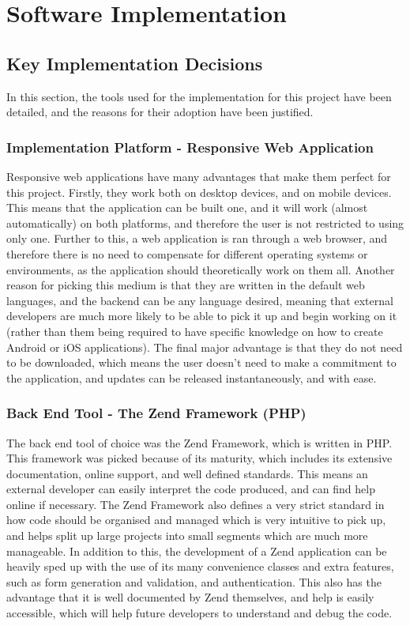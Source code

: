 \section{Software Implementation}

\subsection{Key Implementation Decisions}
\label{sec:kid}
In this section, the tools used for the implementation for this project have been detailed, and the reasons for their adoption have been justified.

\subsubsection{Implementation Platform - Responsive Web Application}
Responsive web applications have many advantages that make them perfect for this project. Firstly, they work both on desktop devices, and on mobile devices. This means that the application can be built one, and it will work (almost automatically) on both platforms, and therefore the user is not restricted to using only one. Further to this, a web application is ran through a web browser, and therefore there is no need to compensate for different operating systems or environments, as the application should theoretically work on them all. Another reason for picking this medium is that they are written in the default web languages, and the backend can be any language desired, meaning that external developers are much more likely to be able to pick it up and begin working on it (rather than them being required to have specific knowledge on how to create Android or iOS applications). The final major advantage is that they do not need to be downloaded, which means the user doesn't need to make a commitment to the application, and updates can be released instantaneously, and with ease. 

\subsubsection{Back End Tool - The Zend Framework (PHP)}
The back end tool of choice was the Zend Framework, which is written in PHP. This framework was picked because of its maturity, which includes its extensive documentation, online support, and well defined standards. This means an external developer can easily interpret the code produced, and can find help online if necessary. The Zend Framework also defines a very strict standard in how code should be organised and managed which is very intuitive to pick up, and helps split up large projects into small segments which are much more manageable. In addition to this, the development of a Zend application can be heavily sped up with the use of its many convenience classes and extra features, such as form generation and validation, and authentication. This also has the advantage that it is well documented by Zend themselves, and help is easily accessible, which will help future developers to understand and debug the code.

